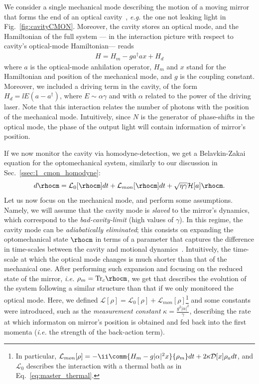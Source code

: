 We consider a single mechanical mode describing the motion of a moving mirror that forms the end of an optical cavity~\cite{Aspelmayer2014cavity}, \textit{e.g.} the one not leaking light in Fig.~\ref{fig:cavityCMON}. Moreover, the cavity stores an optical mode, and the Hamiltonian of the full system --- in the interaction picture with respect to cavity's optical-mode Hamiltonian--- reads
\begin{align}\label{eq:Hopto}
H = H_m - g a^\dagger a x + H_d
\end{align}
where $a$ is the optical-mode anhilation operator, $H_m$ and $x$ stand for the Hamiltonian and position of the mechanical mode, and $g$ is the coupling constant. Moreover, we included a driving term in the cavity, of the form $H_d = \ii E (a-a^\dagger)$, where $E \sim \alpha \gamma$ and with $\alpha$ related to the power of the driving laser. Note that this interaction relates the number of photons with the position of the mechanical mode. Intuitively, since $N$ is the generator of phase-shifts in the optical mode, the phase of the output light will contain information of mirror's position.

If we now monitor the cavity via homodyne-detection, we get a Belavkin-Zakai equation for the optomechanical system, similarly to our discussion in Sec.~\ref{ssec:1_cmon_homodyne}:
\begin{equation}
d\rhocm = \mathcal{L}_0[\rhocm] dt + \mathcal{L}_{mon}[\rhocm]dt + \sqrt{\eta \gamma}\mathcal{H}[a]\rhocm.
\end{equation}
Let us now focus on the mechanical mode, and perform some assumptions. Namely, we will assume that the cavity mode is \textit{slaved} to the mirror's dynamics, which correspond to the \textit{bad-cavity-limit} (high values of $\gamma$). In this regime, the cavity mode can be \textit{adiabatically eliminated}; this consists on expanding the optomechanical state $\rhocm$ in terms of a parameter that captures the difference in time-scales between the cavity and motional dynamics~\cite{doherty1999feedback}. Intuitively, the time-scale at which the optical mode changes is much shorter than that of the mechanical one. After performing such expansion and focusing on the reduced state of the mirror, \textit{i.e.} $\rho_m = \text{Tr}_c \rhocm$, we get
that describes the evolution of the system following a similar structure than that if we only monitored the optical mode. Here, we defined $\mathcal{L}[\rho] = \mathcal{L}_0[\rho] + \mathcal{L}_{mon}[\rho]$\footnote{In particular, $\mathcal{L}_{mon}[\rho] = -\ii\comm{H_m - g|\alpha|^2 x}{\rho_m}dt + 2 \kappa \mathcal{D}[x]\rho_a dt$, and $\mathcal{L}_0$
describes the interaction with a thermal bath as in Eq.~\ref{eq:master_thermal}.} and some constants were introduced, such as the \textit{measurement constant} $\kappa=\frac{g^2 |\alpha|^2}{\gamma}$, describing the rate at which informaton on mirror's position is obtained and fed back into the first momenta (\textit{i.e.} the strength of the back-action term).

